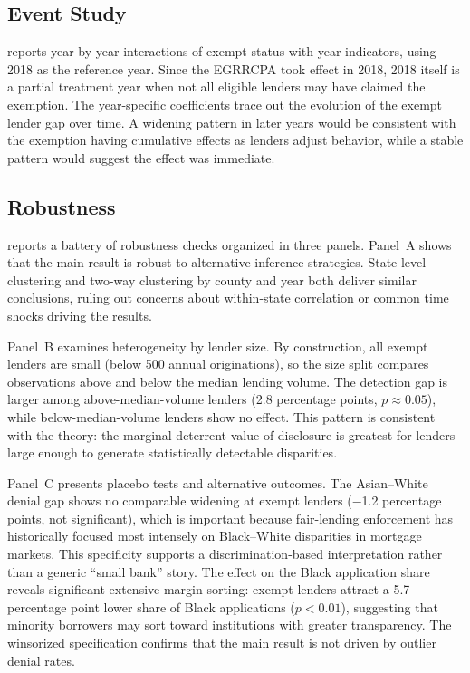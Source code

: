 \documentclass[12pt]{article}
\begin{document}
\subsection{Event Study}



 reports year-by-year interactions of exempt status with year indicators, using 2018 as the reference year. Since the EGRRCPA took effect in 2018, 2018 itself is a partial treatment year when not all eligible lenders may have claimed the exemption. The year-specific coefficients trace out the evolution of the exempt lender gap over time. A widening pattern in later years would be consistent with the exemption having cumulative effects as lenders adjust behavior, while a stable pattern would suggest the effect was immediate.

\subsection{Robustness}



 reports a battery of robustness checks organized in three panels. Panel~A shows that the main result is robust to alternative inference strategies. State-level clustering and two-way clustering by county and year both deliver similar conclusions, ruling out concerns about within-state correlation or common time shocks driving the results.

Panel~B examines heterogeneity by lender size. By construction, all exempt lenders are small (below 500 annual originations), so the size split compares observations above and below the median lending volume. The detection gap is larger among above-median-volume lenders (2.8 percentage points, $p \approx 0.05$), while below-median-volume lenders show no effect. This pattern is consistent with the theory: the marginal deterrent value of disclosure is greatest for lenders large enough to generate statistically detectable disparities.

Panel~C presents placebo tests and alternative outcomes. The Asian--White denial gap shows no comparable widening at exempt lenders ($-$1.2 percentage points, not significant), which is important because fair-lending enforcement has historically focused most intensely on Black--White disparities in mortgage markets. This specificity supports a discrimination-based interpretation rather than a generic ``small bank'' story. The effect on the Black application share reveals significant extensive-margin sorting: exempt lenders attract a 5.7 percentage point lower share of Black applications ($p < 0.01$), suggesting that minority borrowers may sort toward institutions with greater transparency. The winsorized specification confirms that the main result is not driven by outlier denial rates.
\end{document}
